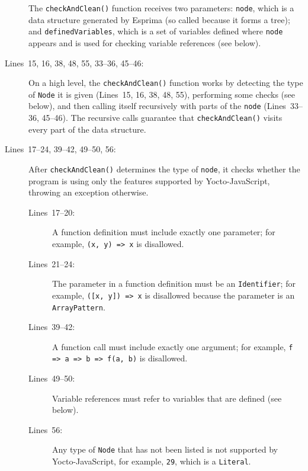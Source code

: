 \documentclass[12pt, oneside]{book}
\begin{document}
\begin{description}
The \texttt{checkAndClean()} function receives two parameters: \texttt{node}, which is a data structure generated by Esprima (so called because it forms a tree); and \texttt{definedVariables}, which is a set of variables defined where \texttt{node} appears and is used for checking variable references (see below).

\item [Lines~15, 16, 38, 48, 55, 33–36, 45–46:]

On a high level, the \texttt{checkAndClean()} function works by detecting the type of \texttt{Node} it is given (Lines~15, 16, 38, 48, 55), performing some checks (see below), and then calling itself recursively with parts of the \texttt{node} (Lines~33–36, 45–46). The recursive calls guarantee that \texttt{checkAndClean()} visits every part of the data structure.

\item [Lines~17–24, 39–42, 49–50, 56:]

After \texttt{checkAndClean()} determines the type of \texttt{node}, it checks whether the program is using only the features supported by Yocto-JavaScript, throwing an exception otherwise.

\begin{description}
\item [Lines~17–20:]

A function definition must include exactly one parameter; for example, \texttt{(x, y) => x} is disallowed.

\item [Lines~21–24:]

The parameter in a function definition must be an \texttt{Identifier}; for example, \texttt{([x, y]) => x} is disallowed because the parameter is an \texttt{ArrayPattern}.

\item [Lines~39–42:]

A function call must include exactly one argument; for example, \texttt{f => a => b => f(a, b)} is disallowed.

\item [Lines~49–50:]

Variable references must refer to variables that are defined (see below).

\item [Lines~56:]

Any type of \texttt{Node} that has not been listed is not supported by Yocto-JavaScript, for example, \texttt{29}, which is a \texttt{Literal}.
\end{description}


\end{description}
\end{document}
